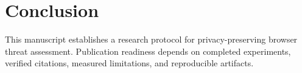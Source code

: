 \documentclass[journal]{IEEEtran}
\begin{document}
\section{Conclusion}
This manuscript establishes a research protocol for privacy-preserving browser threat assessment. Publication readiness depends on completed experiments, verified citations, measured limitations, and reproducible artifacts.



\end{document}
